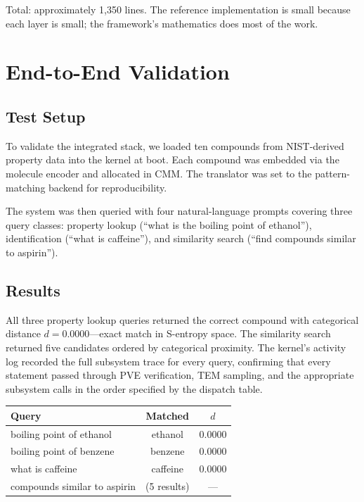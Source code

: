 \documentclass[11pt,twocolumn,a4paper]{article}
\begin{document}
Total: approximately 1,350 lines. The reference implementation is small because each layer is small; the framework's mathematics does most of the work.


\section{End-to-End Validation}
\label{sec:validation}

\subsection{Test Setup}

To validate the integrated stack, we loaded ten compounds from NIST-derived property data into the kernel at boot. Each compound was embedded via the molecule encoder and allocated in CMM. The translator was set to the pattern-matching backend for reproducibility.

The system was then queried with four natural-language prompts covering three query classes: property lookup (``what is the boiling point of ethanol''), identification (``what is caffeine''), and similarity search (``find compounds similar to aspirin'').

\subsection{Results}

All three property lookup queries returned the correct compound with categorical distance $d = 0.0000$---exact match in S-entropy space. The similarity search returned five candidates ordered by categorical proximity. The kernel's activity log recorded the full subsystem trace for every query, confirming that every statement passed through PVE verification, TEM sampling, and the appropriate subsystem calls in the order specified by the dispatch table.

\begin{center}
\begin{tabular}{lcc}
\toprule
\textbf{Query} & \textbf{Matched} & \textbf{$d$} \\
\midrule
boiling point of ethanol & ethanol & 0.0000 \\
boiling point of benzene & benzene & 0.0000 \\
what is caffeine & caffeine & 0.0000 \\
compounds similar to aspirin & (5 results) & --- \\
\bottomrule
\end{tabular}
\end{center}
\end{document}

